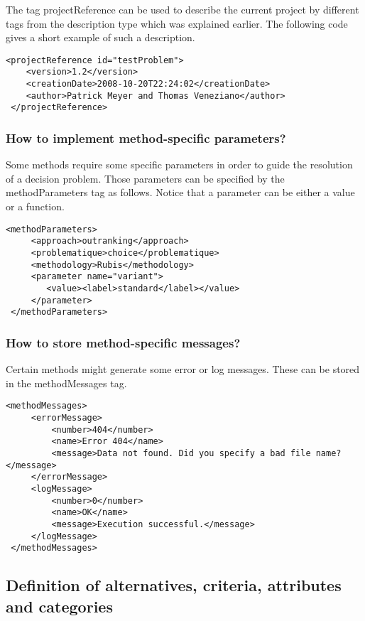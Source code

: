 \documentclass[a4paper,oneside,10 pt]{article}
\newcommand{\code}{\asciifamily}
\begin{document}
The tag {\code projectReference} can be used to describe the current project by different tags from the {\code description} type which was explained earlier. The following code gives a short example of such a description. 
{\code
\begin{lstlisting}[style=prototype]
 <projectReference id="testProblem">
	<version>1.2</version>
	<creationDate>2008-10-20T22:24:02</creationDate>
	<author>Patrick Meyer and Thomas Veneziano</author>
 </projectReference>
\end{lstlisting}
}

\subsubsection{How to implement method-specific parameters?}

Some methods require some specific parameters in order to guide the resolution of a decision problem. Those parameters can be specified by the {\code methodParameters} tag as follows. Notice that a parameter can be either a value or a function.

{\code
\begin{lstlisting}[style=prototype]
 <methodParameters>
	 <approach>outranking</approach>
	 <problematique>choice</problematique>
	 <methodology>Rubis</methodology>
	 <parameter name="variant">
	 	<value><label>standard</label></value>
	 </parameter>
 </methodParameters>
\end{lstlisting}
}

\subsubsection{How to store method-specific messages?}

Certain methods might generate some error or log messages. These can be stored in the {\code methodMessages} tag. 

{\code
\begin{lstlisting}[style=prototype]
 <methodMessages>
	 <errorMessage>
		 <number>404</number>
		 <name>Error 404</name>
		 <message>Data not found. Did you specify a bad file name?</message>
	 </errorMessage>
	 <logMessage>
		 <number>0</number>
		 <name>OK</name>
		 <message>Execution successful.</message>
	 </logMessage>
 </methodMessages>
\end{lstlisting}
}

\subsection{Definition of alternatives, criteria, attributes and categories}
\end{document}
